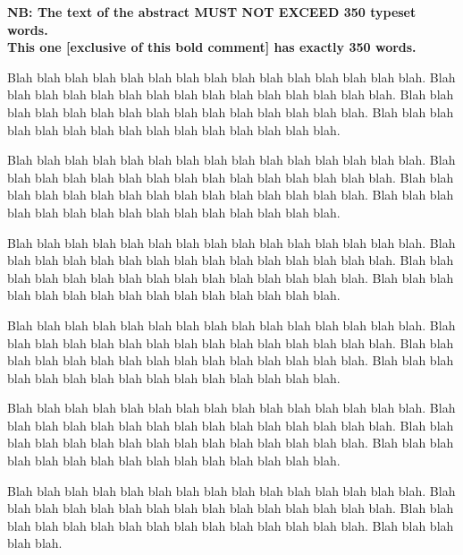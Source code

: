 
\begin{center}
    \large \bf 
    NB: The text of the abstract MUST NOT EXCEED 350 typeset words. \\
    This one [exclusive of this bold comment] has exactly 350 words.
\end{center}

Blah blah blah blah blah blah blah blah blah blah blah blah blah blah blah.
Blah blah blah blah blah blah blah blah blah blah blah blah blah blah blah.
Blah blah blah blah blah blah blah blah blah blah blah blah blah blah blah.
Blah blah blah blah blah blah blah blah blah blah blah blah blah blah blah.

Blah blah blah blah blah blah blah blah blah blah blah blah blah blah blah.
Blah blah blah blah blah blah blah blah blah blah blah blah blah blah blah.
Blah blah blah blah blah blah blah blah blah blah blah blah blah blah blah.
Blah blah blah blah blah blah blah blah blah blah blah blah blah blah blah.

Blah blah blah blah blah blah blah blah blah blah blah blah blah blah blah.
Blah blah blah blah blah blah blah blah blah blah blah blah blah blah blah.
Blah blah blah blah blah blah blah blah blah blah blah blah blah blah blah.
Blah blah blah blah blah blah blah blah blah blah blah blah blah blah blah.

Blah blah blah blah blah blah blah blah blah blah blah blah blah blah blah.
Blah blah blah blah blah blah blah blah blah blah blah blah blah blah blah.
Blah blah blah blah blah blah blah blah blah blah blah blah blah blah blah.
Blah blah blah blah blah blah blah blah blah blah blah blah blah blah blah.

Blah blah blah blah blah blah blah blah blah blah blah blah blah blah blah.
Blah blah blah blah blah blah blah blah blah blah blah blah blah blah blah.
Blah blah blah blah blah blah blah blah blah blah blah blah blah blah blah.
Blah blah blah blah blah blah blah blah blah blah blah blah blah blah blah.

Blah blah blah blah blah blah blah blah blah blah blah blah blah blah blah.
Blah blah blah blah blah blah blah blah blah blah blah blah blah blah blah.
Blah blah blah blah blah blah blah blah blah blah blah blah blah blah blah.
Blah blah blah blah blah.
